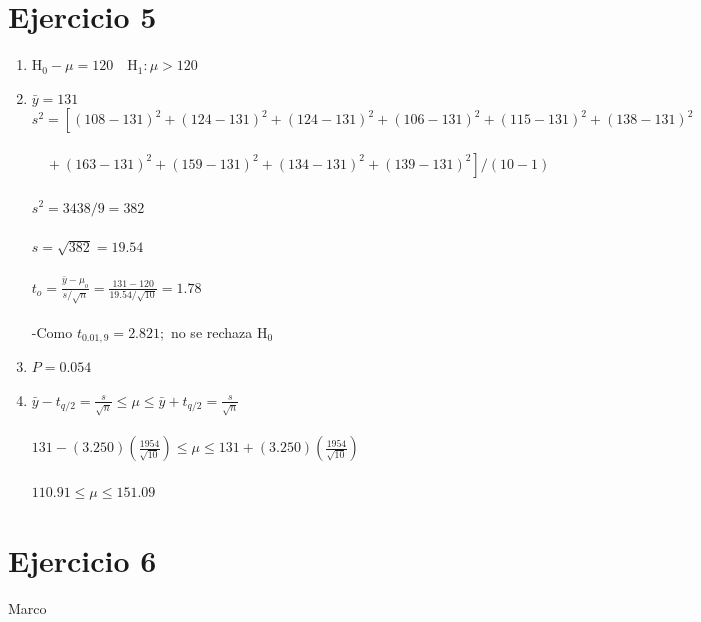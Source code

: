 \documentclass[12pt,a4paper,table]{article}
\begin{document}
\section*{Ejercicio 5}
\begin{enumerate}[label=(\alph*)]
    \item
    		$\mathrm{H}_{0}-\mu=120 \quad \mathrm{H}_{1}: \mu > 120$
    \item
    		$\bar{y}=131$
$s^{2}=\left[(108-131)^{2}+(124-131)^{2}+(124-131)^{2}+(106-131)^{2}+(115-131)^{2}+(138-131)^{2}\right.$\\\\
$\left.\quad+(163-131)^{2}+(159-131)^{2}+(134-131)^{2}+(139-131)^{2}\right] /(10-1)$\\\\
$s^{2}=3438 / 9=382$\\\\
$s=\sqrt{382}=19.54$\\\\
$t_{o}=\frac{\bar{y}-\mu_{o}}{s / \sqrt{n}}=\frac{131-120}{19.54 / \sqrt{10}}=1.78$\\\\
-Como $t_{0.01,9}=2.821 ;$ no se rechaza $\mathrm{H}_{0}$
	\item
		$P=0.054$
	\item
		$\bar{y}-t_{q / 2}=\frac{s}{\sqrt{n}} \leq \mu \leq \bar{y}+t_{q / 2}=\frac{s}{\sqrt{n}}$\\\\
		$131-(3.250)\left(\frac{1954}{\sqrt{10}}\right) \leq \mu \leq 131+(3.250)\left(\frac{1954}{\sqrt{10}}\right)$\\\\
		$110.91 \leq \mu \leq 151.09$
\end{enumerate}

\section*{Ejercicio 6}
Marco
\end{document}
